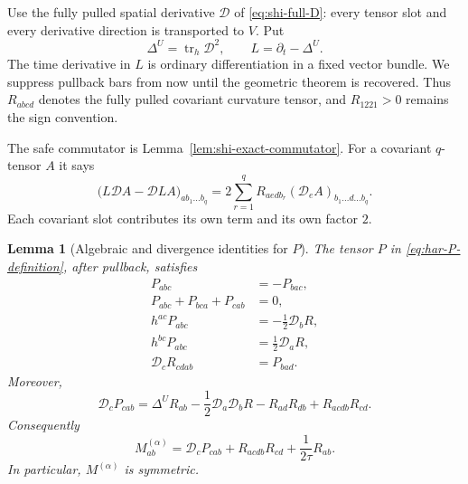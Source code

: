 \documentclass[10pt]{coll-l}
\newtheorem{lemma}[theorem]{Lemma}
\theoremstyle{definition}
\theoremstyle{remark}
\numberwithin{section}{chapter}
\numberwithin{equation}{chapter}
\begin{document}
Use the fully pulled spatial derivative $\mathcal D$ of
\eqref{eq:shi-full-D}: every tensor slot and every derivative direction is
transported to $V$.  Put
\begin{equation}
       \Delta^U=\operatorname{tr}_h\mathcal D^2,
       \qquad L=\partial_t-\Delta^U.                    \label{eq:har-fixed-L}
\end{equation}
The time derivative in $L$ is ordinary differentiation in a fixed vector
bundle.  We suppress pullback bars from now until the geometric theorem is
recovered.  Thus $R_{abcd}$ denotes the fully pulled covariant curvature
tensor, and $R_{1221}>0$ remains the sign convention.

The safe commutator is Lemma~\ref{lem:shi-exact-commutator}.  For a
covariant $q$-tensor $A$ it says
\begin{equation}
 \bigl(L\mathcal D A-\mathcal DLA\bigr)_{a b_1\ldots b_q}
 =2\sum_{r=1}^q
      R_{aedb_r}(\mathcal D_eA)_{b_1\ldots d\ldots b_q}. \label{eq:har-master-commutator}
\end{equation}
Each covariant slot contributes its own term and its own factor $2$.

\begin{lemma}[Algebraic and divergence identities for $P$]
\label{lem:har-P-identities}
The tensor $P$ in \eqref{eq:har-P-definition}, after pullback, satisfies
\begin{align}
 P_{abc}&=-P_{bac},                                      \label{eq:har-P-skew}\\
 P_{abc}+P_{bca}+P_{cab}&=0,                             \label{eq:har-P-cyclic}\\
 h^{ac}P_{abc}&=-\frac12\mathcal D_bR,                  \label{eq:har-P-trace-one}\\
 h^{bc}P_{abc}&=\frac12\mathcal D_aR,                   \label{eq:har-P-trace-two}\\
 \mathcal D_cR_{cdab}&=P_{bad}.                          \label{eq:har-divergence-rm}
\end{align}
Moreover,
\begin{equation}
 \mathcal D_cP_{cab}
 =\Delta^UR_{ab}-\frac12\mathcal D_a\mathcal D_bR
   -R_{ad}R_{db}+R_{acdb}R_{cd}.                         \label{eq:har-divergence-P}
\end{equation}
Consequently
\begin{equation}
 M^{(\alpha)}_{ab}
 =\mathcal D_cP_{cab}+R_{acdb}R_{cd}
     +\frac1{2\tau}R_{ab}.                              \label{eq:har-M-divergence}
\end{equation}
In particular, $M^{(\alpha)}$ is symmetric.
\end{lemma}
\end{document}
